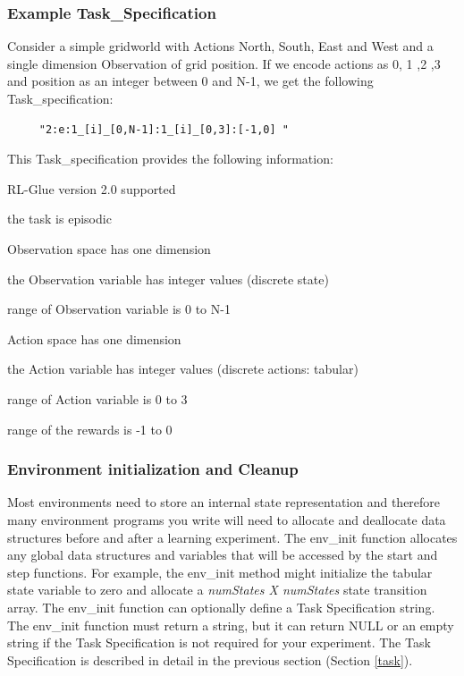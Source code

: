 \documentclass[11pt]{article}
\begin{document}
\subsubsection{Example Task\_Specification}
Consider a simple gridworld with Actions North, South, East and West and a single dimension Observation of grid position. If we encode actions as 0, 1 ,2 ,3 and position as an integer between 0 and N-1, we get the following Task\_specification:
\begin{verbatim}
     "2:e:1_[i]_[0,N-1]:1_[i]_[0,3]:[-1,0] "
\end{verbatim}
This Task\_specification provides the following information:
\begin{description}
\setlength{\itemsep}{-1mm}
\item[-] RL-Glue version 2.0 supported
\item[-] the task is episodic
\item[-] Observation space has one dimension
\item[-] the Observation variable has integer values (discrete state)
\item[-] range of Observation variable is 0 to N-1
\item[-] Action space has one dimension
\item[-] the Action variable has integer values (discrete actions: tabular)
\item[-] range of Action variable is 0 to 3
\item[-] range of the rewards is -1 to 0
\end{description}


        
\subsubsection{Environment initialization and Cleanup}        
Most environments need to store an internal state representation  and therefore many environment programs you write will need to allocate and deallocate data structures before and after a learning experiment. The env\_init function allocates any global data structures and variables that will be accessed by the start and step functions. For example, the env\_init method might initialize the tabular state variable to zero and allocate a {\it numStates X numStates} state transition array. The env\_init function can optionally define a Task Specification string. The env\_init function must return a string, but it can return NULL or an empty string if the Task Specification is not required for your experiment. The Task Specification is described in detail in the previous section (Section \ref{task}).
\end{document}

